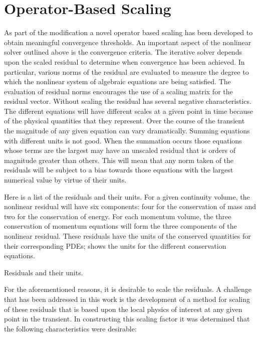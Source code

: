 \section{Operator-Based Scaling}
\label{sect:nln_scaling}

As part of the \cobra{} modification a novel operator based scaling has been developed to obtain meaningful convergence thresholds.
An important aspect of the nonlinear solver outlined above is the convergence criteria.
The iterative solver depends upon the scaled residual to determine when convergence has been achieved.
In particular, various norms of the residual are evaluated to measure the degree to which the nonlinear system of algebraic equations are being satisfied.
The evaluation of residual norms encourages the use of a scaling matrix for the residual vector.
Without scaling the residual has several negative characteristics.
The different equations will have different scales at a given point in time because of the physical quantities that they represent.
Over the course of the transient the magnitude of any given equation can vary dramatically.
Summing equations with different units is not good.
When the summation occurs those equations whose terms are the largest may have an unscaled residual that is orders of magnitude greater than others.
This will mean that any norm taken of the residuals will be subject to a bias towards those equations with the largest numerical value by virtue of their units.

Here is a list of the residuals and their units.
For a given continuity volume, the nonlinear residual will have six components: four for the conservation of mass and two for the conservation of energy.
For each momentum volume, the three conservation of momentum equations will form the three components of the nonlinear residual.
These residuals have the units of the conserved quantities for their corresponding PDEs;  shows the units for the different conservation equations.

\begin{table}[ht]
\centering

\caption{Residuals and their units.}
\label{tab:scaling_units_scales}
\end{table}

For the aforementioned reasons, it is desirable to scale the residuals.
A challenge that has been addressed in this work is the development of a method for scaling of these residuals that is based upon the local physics of interest at any given point in the transient.
In constructing this scaling factor it was determined that the following characteristics were desirable:

